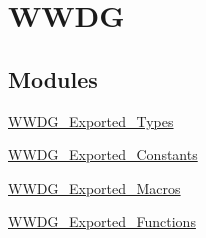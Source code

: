 \hypertarget{group__WWDG}{
\section{WWDG}
\label{group__WWDG}
}
\subsection*{Modules}
\begin{DoxyCompactItemize}
\item 
\hyperlink{group__WWDG__Exported__Types}{WWDG\_\-Exported\_\-Types}
\item 
\hyperlink{group__WWDG__Exported__Constants}{WWDG\_\-Exported\_\-Constants}
\item 
\hyperlink{group__WWDG__Exported__Macros}{WWDG\_\-Exported\_\-Macros}
\item 
\hyperlink{group__WWDG__Exported__Functions}{WWDG\_\-Exported\_\-Functions}
\end{DoxyCompactItemize}
